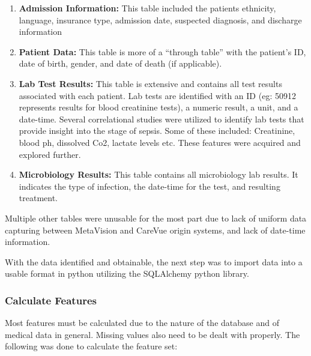 \documentclass[11pt]{article}
\begin{document}
		\begin{enumerate}
			\item \textbf{Admission Information:} This table included the patients ethnicity, language, insurance type, admission date, suspected diagnosis, and discharge information
			
			\item \textbf{Patient Data:} This table is more of a ``through table'' with the patient's ID, date of birth, gender, and date of death (if applicable).
			
			\item \textbf{Lab Test Results:} This table is extensive and contains all test results associated with each patient. Lab tests are identified with an ID (eg: 50912 represents results for blood creatinine tests), a numeric result, a unit, and a date-time. Several correlational studies were utilized to identify lab tests that provide insight into the stage of sepsis. Some of these included: Creatinine, blood ph, dissolved Co2, lactate levels etc. These features were acquired and explored further. 
			
			\item \textbf{Microbiology Results:} This table contains all microbiology lab results. It indicates the type of infection, the date-time for the test, and resulting treatment.
			
		\end{enumerate}
	
		Multiple other tables were unusable for the most part due to lack of uniform data capturing between MetaVision and CareVue origin systems, and lack of date-time information.
		
		With the data identified and obtainable, the next step was to import data into a usable format in python utilizing the SQLAlchemy python library.

		\subsubsection{Calculate Features}
		Most features must be calculated due to the nature of the database and of medical data in general. Missing values also need to be dealt with properly. The following was done to calculate the feature set:
		
\end{document}
